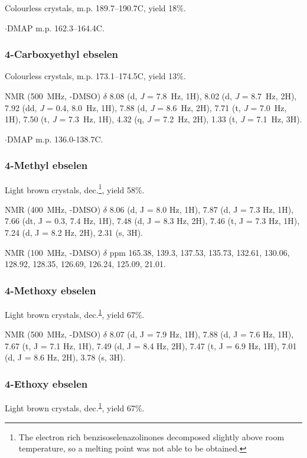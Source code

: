 \begin{refsection}
Colourless crystals, m.p. 189.7--190.7\degree{}C, yield 18\%.

$ \cdot $DMAP m.p. 162.3--164.4\degree{}C.


\subsubsection{4-Carboxyethyl ebselen }
Colourless crystals, m.p. 173.1--174.5\degree{}C, yield 13\%.

 NMR (500~MHz, -DMSO) $ \delta $ 8.08 (d, \textit{J} = 7.8~Hz, 1H), 8.02 (d, \textit{J} = 8.7~Hz, 2H), 7.92 (dd, \textit{J} = 0.4, 8.0~Hz, 1H), 7.88 (d, \textit{J} = 8.6~Hz, 2H), 7.71 (t, \textit{J} = 7.0~Hz, 1H), 7.50 (t, \textit{J} = 7.3~Hz, 1H), 4.32 (q, \textit{J} = 7.2~Hz, 2H), 1.33 (t, \textit{J} = 7.1~Hz, 3H).

$ \cdot $DMAP m.p. 136.0-138.7\degree{}C.


\subsubsection{4-Methyl ebselen }
Light brown crystals, dec.\footnote{\label{fn:decompose} The electron rich benzisoselenazolinones decomposed slightly above room temperature, so a melting point was not able to be obtained.}, yield 58\%.

 NMR (400~MHz, -DMSO) $ \delta $ 8.06 (d, J = 8.0 Hz, 1H), 7.87 (d, J = 7.3 Hz, 1H), 7.66 (dt, J = 0.3, 7.4 Hz, 1H), 7.48 (d, J = 8.3 Hz, 2H), 7.46 (t, J = 7.3 Hz, 1H), 7.24 (d, J = 8.2 Hz, 2H), 2.31 (s, 3H).

 NMR (100~MHz, -DMSO) $\delta$ ppm 165.38, 139.3, 137.53, 135.73, 132.61, 130.06, 128.92, 128.35, 126.69, 126.24, 125.09, 21.01.

\subsubsection{4-Methoxy ebselen }
Light brown crystals, dec.\textsuperscript{\ref{fn:decompose}}, yield 67\%.

 NMR (500~MHz, -DMSO) $ \delta $ 8.07 (d, J = 7.9 Hz, 1H), 7.88 (d, J = 7.6 Hz, 1H), 7.67 (t, J = 7.1 Hz, 1H), 7.49 (d, J = 8.4 Hz, 2H), 7.47 (t, J = 6.9 Hz, 1H), 7.01 (d, J = 8.6 Hz, 2H), 3.78 (s, 3H).

\subsubsection{4-Ethoxy ebselen }
Light brown crystals, dec.\textsuperscript{\ref{fn:decompose}}, yield 67\%.


\end{refsection}
